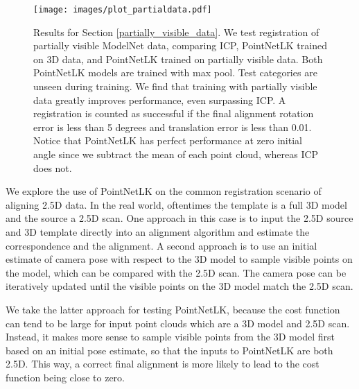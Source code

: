 \documentclass[10pt,twocolumn,letterpaper]{article}
\begin{document}
\begin{figure}[htbp]
\centering
\texttt{[image: images/plot\_partialdata.pdf]}
\caption{Results for Section \ref{partially_visible_data}. We test registration of partially visible ModelNet data, comparing ICP, PointNetLK trained on 3D data, and PointNetLK trained on partially visible data. Both PointNetLK models are trained with max pool. Test categories are unseen during training. We find that training with partially visible data greatly improves performance, even surpassing ICP. A registration is counted as successful if the final alignment rotation error is less than 5 degrees and translation error is less than 0.01. Notice that PointNetLK has perfect performance at zero initial angle since we subtract the mean of each point cloud, whereas ICP does not.}
\label{fig_partiallyvisibleplot}
\end{figure}

We explore the use of PointNetLK on the common registration scenario of aligning 2.5D data. In the real world, oftentimes the template is a full 3D model and the source a 2.5D scan. One approach in this case is to input the 2.5D source and 3D template directly into an alignment algorithm and estimate the correspondence and the alignment. A second approach is to use an initial estimate of camera pose with respect to the 3D model to sample visible points on the model, which can be compared with the 2.5D scan. The camera pose can be iteratively updated until the visible points on the 3D model match the 2.5D scan.

We take the latter approach for testing PointNetLK, because the cost function  can tend to be large for input point clouds which are a 3D model and 2.5D scan. Instead, it makes more sense to sample visible points from the 3D model first based on an initial pose estimate, so that the inputs to PointNetLK are both 2.5D. This way, a correct final alignment is more likely to lead to the cost function  being close to zero.
\end{document}
